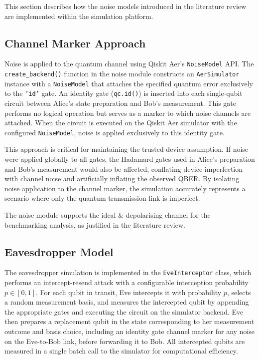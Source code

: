 \documentclass[10pt, a4paper]{report}
\begin{document}
This section describes how the noise models introduced in the literature review are implemented within the simulation platform.

\subsection{Channel Marker Approach}

Noise is applied to the quantum channel using Qiskit Aer's \texttt{NoiseModel} API. The \texttt{create\_backend()} function in the noise module constructs an \texttt{AerSimulator} instance with a \texttt{NoiseModel} that attaches the specified quantum error exclusively to the \texttt{'id'} gate. An identity gate (\texttt{qc.id()}) is inserted into each single-qubit circuit between Alice's state preparation and Bob's measurement. This gate performs no logical operation but serves as a marker to which noise channels are attached. When the circuit is executed on the Qiskit Aer simulator with the configured \texttt{NoiseModel}, noise is applied exclusively to this identity gate.

This approach is critical for maintaining the trusted-device assumption. If noise were applied globally to all gates, the Hadamard gates used in Alice's preparation and Bob's measurement would also be affected, conflating device imperfection with channel noise and artificially inflating the observed QBER. By isolating noise application to the channel marker, the simulation accurately represents a scenario where only the quantum transmission link is imperfect.

The noise module supports the ideal \& depolarising channel for the benchmarking analysis, as justified in the literature review.

\subsection{Eavesdropper Model}

The eavesdropper simulation is implemented in the \texttt{EveInterceptor} class, which performs an intercept-resend attack with a configurable interception probability $p \in [0, 1]$. For each qubit in transit, Eve intercepts it with probability $p$, selects a random measurement basis, and measures the intercepted qubit by appending the appropriate gates and executing the circuit on the simulator backend. Eve then prepares a replacement qubit in the state corresponding to her measurement outcome and basis choice, including an identity gate channel marker for any noise on the Eve-to-Bob link, before forwarding it to Bob. All intercepted qubits are measured in a single batch call to the simulator for computational efficiency.
\end{document}
